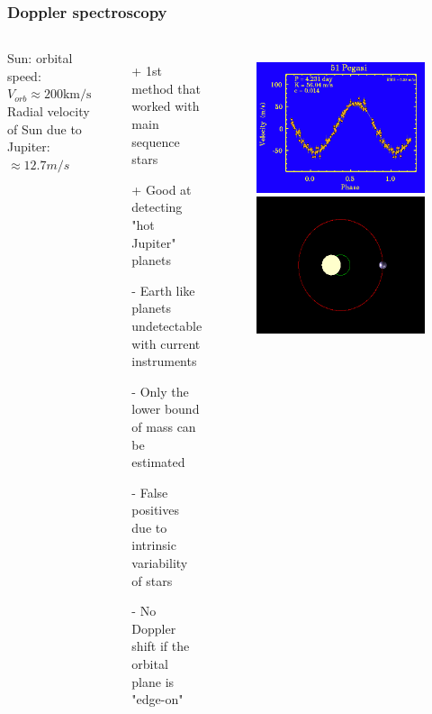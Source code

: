 \documentclass[aspectratio=169]{beamer}
\begin{document}
\begin{frame}
\frametitle{Doppler spectroscopy}

\begin{columns}
Sun: orbital speed: $V_{orb} \approx 200 \mathrm{km/s}$ \\
Radial velocity of Sun due to Jupiter: $\approx 12.7 m/s$ \\
\begin{itemize}
\item[+] 1st method that worked with main sequence stars
\item[+] Good at detecting "hot Jupiter" planets
\item[-] Earth like planets undetectable with current instruments
\item[-] Only the lower bound of mass can be estimated
\item[-] False positives due to intrinsic variability of stars
\item[-] No Doppler shift if the orbital plane is "edge-on"
\end{itemize}
\begin{figure}
\includegraphics[width=\textwidth]{img/51Pegasi.png}
\includegraphics[width=\textwidth]{img/Dopplerspectr-above.png}
\end{figure}


\end{columns}
\end{frame}
\end{document}
